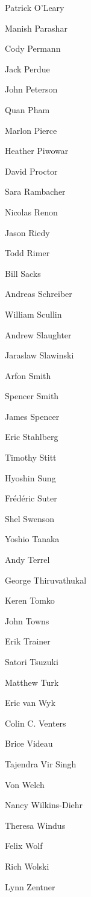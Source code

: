 \documentclass[11pt, oneside]{amsart}
\begin{document}
\begin{multicols}{3}
Patrick O'Leary

Manish Parashar

Cody Permann

Jack Perdue

John Peterson

Quan Pham

Marlon Pierce

Heather Piwowar

David Proctor

Sara Rambacher

Nicolas Renon

Jason Riedy

Todd Rimer

Bill Sacks

Andreas Schreiber

William Scullin

Andrew Slaughter

Jaraslaw Slawinski

Arfon Smith

Spencer Smith

James Spencer

Eric Stahlberg

Timothy Stitt

Hyoshin Sung

Fr\'{e}d\'{e}ric Suter

Shel Swenson

Yoshio Tanaka

Andy Terrel

George  Thiruvathukal

Keren Tomko

John Towns

Erik Trainer

Satori Tsuzuki

Matthew Turk

Eric van Wyk

Colin C. Venters

Brice Videau

Tajendra Vir Singh

Von Welch

Nancy Wilkins-Diehr

Theresa Windus

Felix Wolf

Rich Wolski

Lynn Zentner

\end{multicols}






\end{document}
